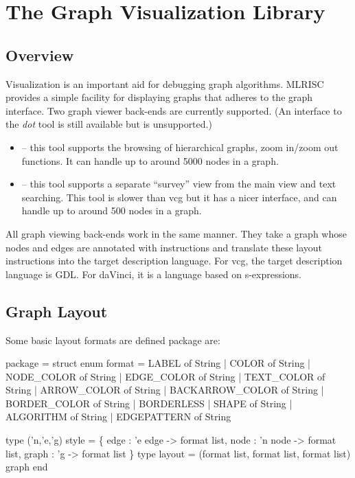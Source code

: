 \section{The Graph Visualization Library}
\subsection{Overview}
Visualization is an important aid for debugging graph algorithms.
MLRISC provides a simple facility for displaying graphs that
adheres to the graph interface.  Two graph viewer 
back-ends are currently supported.  (An interface to the \emph{dot}
tool is still available but is unsupported.)
\begin{itemize}
 \item {} -- 
     this tool supports the browsing
 of hierarchical graphs, zoom in/zoom out functions.  It can
 handle up to around 5000 nodes in a graph.
 \item {} -- 
   this tool supports a separate
 ``survey'' view from the main view and text searching.  This tool is
slower than vcg but it has a nicer interface, and
 can handle up to around 500 nodes in a graph.
\end{itemize}
All graph viewing back-ends work in the same manner.  
They take a graph whose nodes and edges are annotated with 
instructions and translate these layout instructions
into the target description language.  For vcg, the target description
language is GDL.  For daVinci, it is a language based on s-expressions.

\subsection{Graph Layout}
Some basic layout formats are defined package  are:
\begin{SML}
 package  = struct
   enum format =
     LABEL of String
   | COLOR of String
   | NODE_COLOR of String
   | EDGE_COLOR of String
   | TEXT_COLOR of String
   | ARROW_COLOR of String
   | BACKARROW_COLOR of String
   | BORDER_COLOR of String
   | BORDERLESS 
   | SHAPE of String 
   | ALGORITHM of String
   | EDGEPATTERN of String

   type ('n,'e,'g) style = 
      \{ edge  : 'e edge -> format list,
        node  : 'n node -> format list,
        graph : 'g -> format list
      \}
   type layout = (format list, format list, format list) graph
 end
\end{SML}

